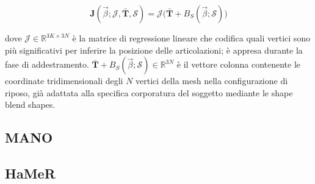 \begin{equation}
    \mathbf{J}(\vec{\beta}; \mathcal{J}, \bar{\mathbf{T}}, \mathcal{S}) = \mathcal{J} \big( \bar{\mathbf{T}} + B_S(\vec{\beta}; \mathcal{S}) \big)
\end{equation}

dove $\mathcal{J} \in \mathbb{R}^{3K \times 3N}$ è la matrice di regressione lineare che codifica quali vertici sono più significativi per inferire la posizione delle articolazioni;
è appresa durante la fase di addestramento.
$\bar{\mathbf{T}} + B_S(\vec{\beta}; \mathcal{S}) \in \mathbb{R}^{3N}$ è il vettore colonna contenente le coordinate tridimensionali degli $N$ vertici della mesh nella configurazione di riposo, già adattata alla specifica corporatura del soggetto mediante le shape blend shapes.


\subsection{MANO}

\subsection{HaMeR}